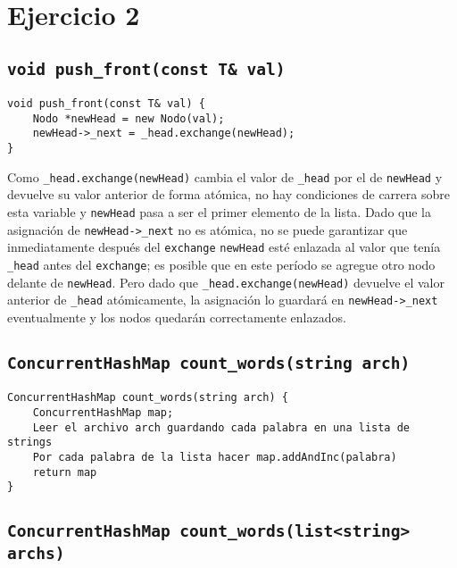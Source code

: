 \section{Ejercicio 2}


\subsection{\texttt{void push_front(const T& val)}}

\begin{verbatim}
void push_front(const T& val) {
	Nodo *newHead = new Nodo(val);
	newHead->_next = _head.exchange(newHead);
}
\end{verbatim}

Como \texttt{_head.exchange(newHead)} cambia el valor de \texttt{_head} por el de \texttt{newHead} y devuelve su valor anterior de forma atómica, no hay condiciones de carrera sobre esta variable y \texttt{newHead} pasa a ser el primer elemento de la lista. Dado que la asignación de \texttt{newHead->_next} no es atómica, no se puede garantizar que inmediatamente después del \texttt{exchange} \texttt{newHead} esté enlazada al valor que tenía \texttt{_head} antes del \texttt{exchange}; es posible que en este período se agregue otro nodo delante de \texttt{newHead}. Pero dado que \texttt{_head.exchange(newHead)} devuelve el valor anterior de \texttt{_head} atómicamente, la asignación lo guardará en \texttt{newHead->_next} eventualmente y los nodos quedarán correctamente enlazados.


\subsection{\texttt{ConcurrentHashMap count_words(string arch)}}

\begin{verbatim}
ConcurrentHashMap count_words(string arch) {
	ConcurrentHashMap map;
	Leer el archivo arch guardando cada palabra en una lista de strings
	Por cada palabra de la lista hacer map.addAndInc(palabra)
	return map
}
\end{verbatim}


\subsection{\texttt{ConcurrentHashMap count_words(list<string> archs)}}

